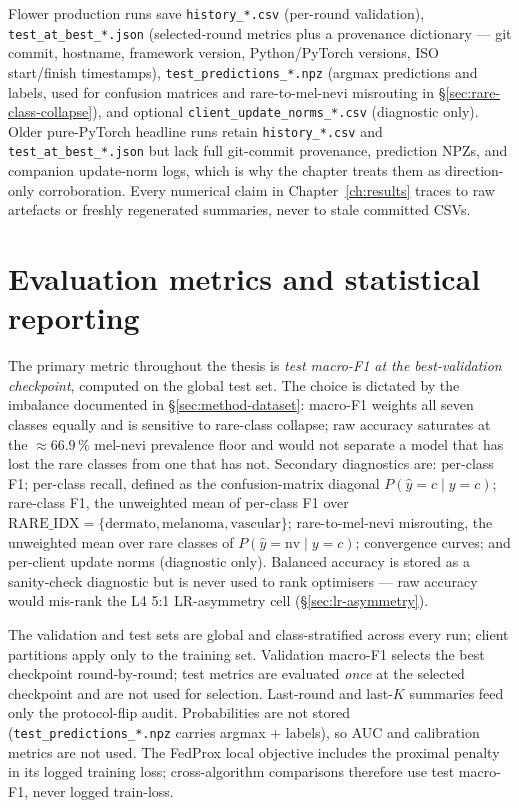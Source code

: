 \documentclass[11pt,a4paper]{report}
\begin{document}
Flower production runs save \texttt{history\_*.csv} (per-round
validation), \texttt{test\_at\_best\_*.json} (selected-round metrics
plus a provenance dictionary --- git commit, hostname, framework
version, Python/PyTorch versions, ISO start/finish timestamps),
\texttt{test\_predictions\_*.npz} (argmax predictions and labels, used
for confusion matrices and rare-to-mel-nevi misrouting in
§\ref{sec:rare-class-collapse}), and optional
\texttt{client\_update\_norms\_*.csv} (diagnostic only). Older
pure-PyTorch headline runs retain \texttt{history\_*.csv} and
\texttt{test\_at\_best\_*.json} but lack full git-commit provenance,
prediction NPZs, and companion update-norm logs, which is why the
chapter treats them as direction-only corroboration. Every numerical
claim in Chapter~\ref{ch:results} traces to raw artefacts or freshly
regenerated summaries, never to stale committed CSVs.

\section{Evaluation metrics and statistical reporting}
\label{sec:method-metrics}

The primary metric throughout the thesis is \emph{test macro-F1 at the
best-validation checkpoint}, computed on the global test set. The choice
is dictated by the imbalance documented in §\ref{sec:method-dataset}:
macro-F1 weights all seven classes equally
and is sensitive to rare-class collapse; raw accuracy saturates at the
$\approx 66.9\,\%$ mel-nevi prevalence floor and would not separate a
model that has lost the rare classes from one that has not. Secondary
diagnostics are: per-class F1; per-class recall, defined as the
confusion-matrix diagonal $P(\hat{y} = c \mid y = c)$;
rare-class F1, the unweighted mean of per-class F1 over $\mathrm{RARE\_IDX}
= \{\text{dermato}, \text{melanoma}, \text{vascular}\}$;
rare-to-mel-nevi misrouting, the unweighted mean over rare classes of
$P(\hat{y} = \text{nv} \mid y = c)$; convergence curves; and per-client
update norms (diagnostic only). Balanced accuracy is stored as a
sanity-check diagnostic but is never used to rank optimisers --- raw
accuracy would mis-rank the L4 5{:}1 LR-asymmetry cell
(§\ref{sec:lr-asymmetry}).

The validation and test sets are global and class-stratified across
every run; client partitions apply only to the training set. Validation
macro-F1 selects the best checkpoint round-by-round; test metrics are
evaluated \emph{once} at the selected checkpoint and are not used for
selection. Last-round and last-$K$ summaries feed only the
protocol-flip audit. Probabilities are not stored
(\texttt{test\_predictions\_*.npz} carries argmax + labels), so AUC and
calibration metrics are not used. The FedProx local objective includes the
proximal penalty in its logged training loss; cross-algorithm comparisons
therefore use test macro-F1, never logged train-loss.
\end{document}
